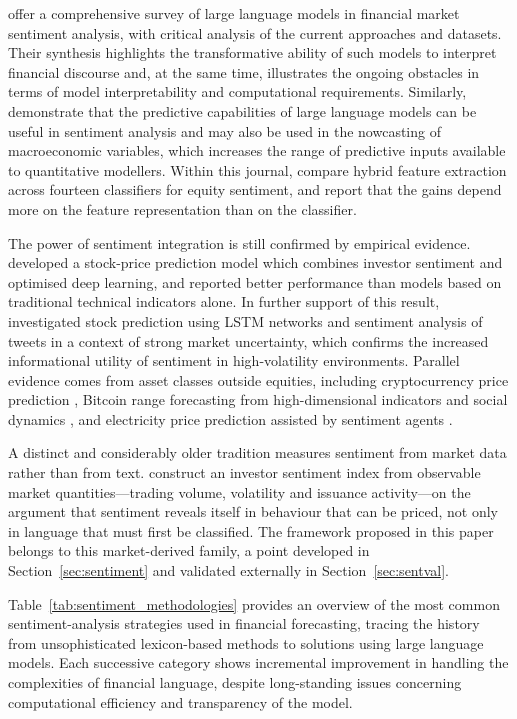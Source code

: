 \documentclass{singlecol-new}
\theoremstyle{TH}{
\newtheorem{lemma}{Lemma}
\newtheorem{theorem}[lemma]{Theorem}
\newtheorem{corrolary}[lemma]{Corrolary}
\newtheorem{conjecture}[lemma]{Conjecture}
\newtheorem{proposition}[lemma]{Proposition}
\newtheorem{claim}[lemma]{Claim}
\newtheorem{stheorem}[lemma]{Wrong Theorem}
\newtheorem{algorithm}{Algorithm}
}
\theoremstyle{THrm}{
\newtheorem{definition}{Definition}[section]
\newtheorem{question}{Question}[section]
\newtheorem{remark}{Remark}
\newtheorem{scheme}{Scheme}
}
\theoremstyle{THhit}{
\newtheorem{case}{Case}[section]
}
\begin{document}
\citet{liu24} offer a comprehensive survey of large language models in financial market
sentiment analysis, with critical analysis of the current approaches and datasets. Their
synthesis highlights the transformative ability of such models to interpret financial
discourse and, at the same time, illustrates the ongoing obstacles in terms of model
interpretability and computational requirements. Similarly, \citet{onozo24} demonstrate
that the predictive capabilities of large language models can be useful in sentiment
analysis and may also be used in the nowcasting of macroeconomic variables, which
increases the range of predictive inputs available to quantitative modellers. Within this
journal, \citet{george25} compare hybrid feature extraction across fourteen classifiers
for equity sentiment, and report that the gains depend more on the feature representation
than on the classifier.

The power of sentiment integration is still confirmed by empirical evidence.
\citet{mu23} developed a stock-price prediction model which combines investor sentiment
and optimised deep learning, and reported better performance than models based on
traditional technical indicators alone. In further support of this result,
\citet{bacco24} investigated stock prediction using LSTM networks and sentiment analysis
of tweets in a context of strong market uncertainty, which confirms the increased
informational utility of sentiment in high-volatility environments. Parallel evidence
comes from asset classes outside equities, including cryptocurrency price prediction
\citep{parekh22,otabek22}, Bitcoin range forecasting from high-dimensional indicators and
social dynamics \citep{shang25}, and electricity price prediction assisted by
sentiment agents \citep{lu25}.

A distinct and considerably older tradition measures sentiment from market data rather
than from text. \citet{bakerwurgler07} construct an investor sentiment index from
observable market quantities---trading volume, volatility and issuance activity---on the
argument that sentiment reveals itself in behaviour that can be priced, not only in
language that must first be classified. The framework proposed in this paper belongs to
this market-derived family, a point developed in Section~\ref{sec:sentiment} and validated
externally in Section~\ref{sec:sentval}.

Table~\ref{tab:sentiment_methodologies} provides an overview of the most common
sentiment-analysis strategies used in financial forecasting, tracing the history from
unsophisticated lexicon-based methods to solutions using large language models. Each
successive category shows incremental improvement in handling the complexities of
financial language, despite long-standing issues concerning computational efficiency and
transparency of the model.
\end{document}
